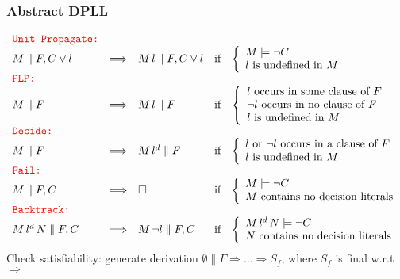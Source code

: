 \documentclass[smaller]{beamer}
\newcommand{\state}[2]{{#1\parallel #2}}
\newcommand{\red}[1]{\textcolor{red}{#1}}
\begin{document}
\begin{frame}
\frametitle{Abstract DPLL}
\small
\[
\begin{array}{lclcl}
\red{\mbox{\tt Unit Propagate:}} \\
\state{M}{F,C\vee l}&\Longrightarrow& \state{M\,l}{F,C\vee l} &\mbox{if} &\left\{\begin{array}{l}
														      M\models \neg C\\
														      \mbox{$l$ is undefined in $M$}																	      \end{array}\right. \\[2mm]
\red{\mbox{\tt PLP:}} \\
\state{M}{F}&\Longrightarrow& \state{M\,l}{F} &\mbox{if} &\left\{\begin{array}{l}
												\mbox{$l$ occurs in some clause of $F$}\\
												\mbox{$\neg l$ occurs in no clause of $F$} \\
												\mbox{$l$ is undefined in $M$}
												\end{array}\right. \\[2mm]
\red{\mbox{\tt Decide:}} \\
\state{M}{F}&\Longrightarrow& \state{M\,l^d}{F} &\mbox{if} &\left\{\begin{array}{l}
												\mbox{$l$ or $\neg l$ occurs in a clause of $F$}\\
												\mbox{$l$ is undefined in $M$}
												\end{array}\right. \\[2mm]
\red{\mbox{\tt Fail:}} \\
\state{M}{F,C}&\Longrightarrow& \Box &\mbox{if} &\left\{\begin{array}{l}
											M\models \neg C\\
											\mbox{$M$ contains no decision literals}															        \end{array}\right. \\[2mm]
\red{\mbox{\tt Backtrack:}} \\
\state{M\, l^d\, N}{F,C}&\Longrightarrow& \state{M\,\neg l}{F,C} &\mbox{if} &\left\{\begin{array}{l}
														      M\, l^d\, N\models \neg C\\
														      \mbox{$N$ contains no decision literals}															     \end{array}\right. 
\end{array}
\]
Check satisfiability: generate derivation $\state{\emptyset}{F}\Longrightarrow\ldots\Longrightarrow S_f$, where $S_f$ is final w.r.t $\Longrightarrow$
\end{frame}
\end{document}
